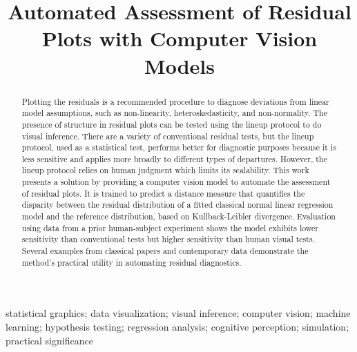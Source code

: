 \documentclass[]{interact}
\theoremstyle{plain}%
\theoremstyle{definition}
\theoremstyle{remark}
\begin{document}
\articletype{}

\title{Automated Assessment of Residual Plots with Computer Vision
Models}


\author{
}


\maketitle

\begin{abstract}
Plotting the residuals is a recommended procedure to diagnose deviations
from linear model assumptions, such as non-linearity,
heteroskedasticity, and non-normality. The presence of structure in
residual plots can be tested using the lineup protocol to do visual
inference. There are a variety of conventional residual tests, but the
lineup protocol, used as a statistical test, performs better for
diagnostic purposes because it is less sensitive and applies more
broadly to different types of departures. However, the lineup protocol
relies on human judgment which limits its scalability. This work
presents a solution by providing a computer vision model to automate the
assessment of residual plots. It is trained to predict a distance
measure that quantifies the disparity between the residual distribution
of a fitted classical normal linear regression model and the reference
distribution, based on Kullback-Leibler divergence. Evaluation using
data from a prior human-subject experiment shows the model exhibits
lower sensitivity than conventional tests but higher sensitivity than
human visual tests. Several examples from classical papers and
contemporary data demonstrate the method's practical utility in
automating residual diagnostics.
\end{abstract}

\begin{keywords}
statistical graphics; data visualization; visual inference; computer
vision; machine learning; hypothesis testing; regression analysis;
cognitive perception; simulation; practical significance
\end{keywords}
\end{document}
